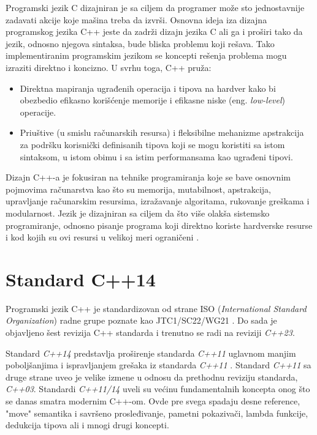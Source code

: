 \documentclass[12pt,oneside]{memoir}
\begin{document}
Programski jezik C dizajniran je sa ciljem da programer mo\v{z}e sto jednostavnije zadavati akcije koje ma\v{s}ina treba da izvr\v{s}i.
Osnovna ideja iza dizajna programskog jezika C++ jeste da zadr\v{z}i dizajn jezika C ali ga i pro\v{s}iri tako da jezik, odnosno njegova sintaksa, bude bliska problemu koji re\v{s}ava. Tako implementiranim programskim jezikom se koncepti re\v{s}enja problema mogu izraziti direktno i koncizno.
U svrhu toga, C++ pru\v{z}a:
\begin{itemize}
  \item {Direktna mapiranja ugrađenih operacija i tipova na hardver kako bi obezbedio efikasno kori\v{s}\'{c}enje memorije i efikasne niske (eng. \textit{low-level}) operacije.}
  \item {Priu\v{s}tive (u smislu ra\v{c}unarskih resursa) i fleksibilne mehanizme apstrakcija za podr\v{s}ku korisni\v{c}ki definisanih tipova koji se mogu koristiti sa istom sintaksom, u istom obimu i sa istim performansama kao ugrađeni tipovi.}
\end{itemize}

Dizajn C++-a je fokusiran na tehnike programiranja koje se bave osnovnim pojmovima ra\v{c}unarstva kao \v{s}to su memorija, mutabilnost, apstrakcija, upravljanje ra\v{c}unarskim resursima, izra\v{z}avanje algoritama, rukovanje gre\v{s}kama i modularnost. Jezik je dizajniran sa ciljem da \v{s}to vi\v{s}e olak\v{s}a sistemsko programiranje, odnosno pisanje programa koji direktno koriste hardverske resurse i kod kojih su ovi resursi u velikoj meri ograni\v{c}eni \cite{TheC++ProgrammingLanguage}.


\section{Standard C++14}

Programski jezik C++ je standardizovan od strane ISO (\textit{International Standard Organization}) radne grupe poznate kao JTC1/SC22/WG21 \cite{ISOWebsite}. Do sada je objavljeno \v{s}est revizija C++ standarda i trenutno se radi na reviziji \textit{C++23}. 
\indent

Standard \textit{C++14} predstavlja pro\v{s}irenje standarda \textit{C++11} uglavnom manjim pobolj\v{s}anjima i ispravljanjem gre\v{s}aka iz standarda \textit{C++11} . Standard \textit{C++11} sa druge strane uveo je velike izmene u odnosu da prethodnu reviziju standarda, \textit{C++03}. 
Standardi \textit{C++11/14} uveli su ve\'{c}inu fundamentalnih koncepta onog \v{s}to se danas smatra modernim C++-om. Ovde pre svega spadaju desne reference, "move" semantika i savr\v{s}eno prosleđivanje, pametni pokaziva\v{c}i, lambda funkcije, dedukcija tipova ali i mnogi drugi koncepti.
\end{document}
